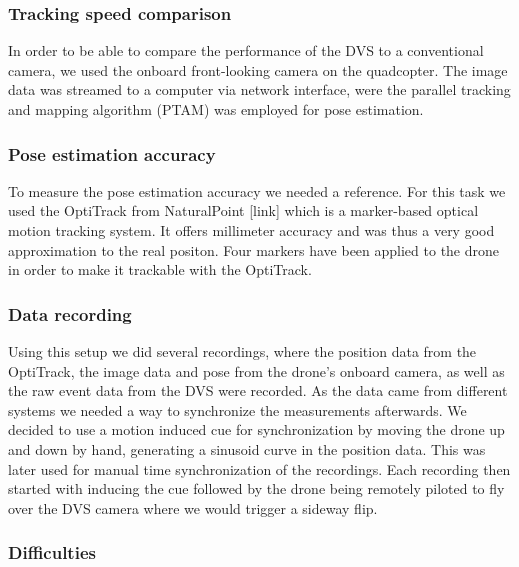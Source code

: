 \subsubsection{Tracking speed comparison}\label{sec:trackingspeedcomparison}

In order to be able to compare the performance of the DVS to a conventional camera, we used the onboard front-looking camera on the quadcopter. The image data was streamed to a computer via network interface, were the parallel tracking and mapping algorithm (PTAM) was employed for pose estimation.


\subsubsection{Pose estimation accuracy}\label{sec:poseaccuracy}

To measure the pose estimation accuracy we needed a reference. For this task we used the OptiTrack from NaturalPoint [link] which is a marker-based optical motion tracking system. It offers millimeter accuracy and was thus a very good approximation to the real positon. Four markers have been applied to the drone in order to make it trackable with the OptiTrack.

\subsubsection{Data recording}\label{sec:datarecording}

Using this setup we did several recordings, where the position data from the OptiTrack, the image data and pose from the drone’s onboard camera, as well as the raw event data from the DVS were recorded.
As the data came from different systems we needed a way to synchronize the measurements afterwards. We decided to use a motion induced cue for synchronization by moving the drone up and down by hand, generating a sinusoid curve in the position data. This was later used for manual time synchronization of the recordings. 
Each recording then started with inducing the cue followed by the drone being remotely piloted to fly over the DVS camera where we would trigger a sideway flip. 


\subsubsection{Difficulties}\label{sec:difficulties}


